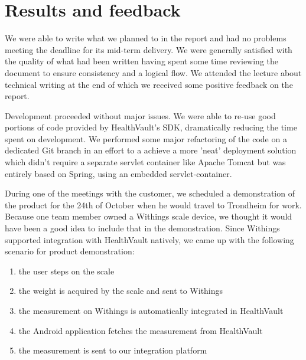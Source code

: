 \section{Results and feedback}

We were able to write what we planned to in the report and had no problems meeting the deadline for
its mid-term delivery. We were generally satisfied with the quality of what had
been written having spent some time reviewing the document to ensure consistency and a logical flow.
We attended the lecture about technical writing at the end of which we received some positive
feedback on the report.

Development proceeded without major issues. We were able to re-use good portions of code provided
by HealthVault's SDK, dramatically reducing the time spent on development.
We performed some major refactoring of the code on a dedicated Git branch in an effort
to a achieve a more 'neat' deployment solution which didn't require a separate servlet container like
Apache Tomcat but was entirely based on Spring, using an embedded servlet-container.

During one of the meetings with the customer, we scheduled a demonstration of the product
for the 24th of October when he would travel to Trondheim for work.
Because one team member owned a Withings scale device, we thought it would have been
a good idea to include that in the demonstration.
Since Withings supported integration with HealthVault natively, we came up with the
following scenario for product demonstration:

\begin{enumerate}[1)]
\item the user steps on the scale
\item the weight is acquired by the scale and sent to Withings
\item the measurement on Withings is automatically integrated in HealthVault
\item the Android application fetches the measurement from HealthVault
\item the measurement is sent to our integration platform
\end{enumerate}


